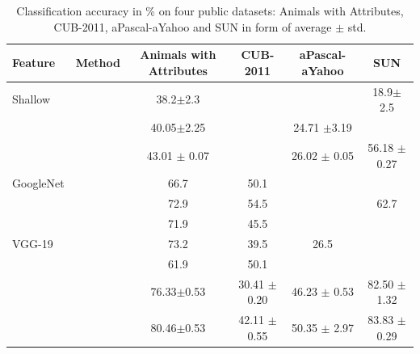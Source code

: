 \documentclass[letterpaper]{article}
\begin{document}

\begin{table}[ht]
\begin{minipage}{\textwidth}
\centering
\caption{Classification accuracy in \% on four public datasets: Animals with Attributes, CUB-2011, aPascal-aYahoo and SUN
in form of average $\pm$ std.
} \label{tab:results}
\begin{tabular}{|l|l|c|c|c|c|}
\hline
Feature & Method & Animals with Attributes & CUB-2011 & aPascal-aYahoo & SUN \\
\hline
{Shallow}
&  \cite{li15max}                 &  38.2$\pm$2.3   &                 &                         & 18.9$\pm$2.5 \\
& \cite{semi15}                    &  40.05$\pm$2.25 &                 &   24.71 $\pm$3.19       &     \\
& \cite{jayaraman14}  &43.01 $\pm$ 0.07 &                 & 26.02 $\pm$ 0.05        & 56.18 $\pm$ 0.27 \\
\hline
{GoogleNet}
& \cite{Akata2015}              & 66.7            & 50.1            &                         & \\
& \cite{Synthesized}       & 72.9            & 54.5            &                         & 62.7 \\
& \cite{Xian2016}                & 71.9            & 45.5            &                         & \\
\hline
{VGG-19}
&  \cite{Kodirov2015}
                                            & 73.2            &  39.5           & 26.5                    &  \\
& \cite{Akata2015}              & 61.9            &  50.1           &                         & \\
&  \cite{sse}            &  76.33$\pm$0.53 & 30.41 $\pm$0.20 &   46.23 $\pm$ 0.53      & 82.50 $\pm$ 1.32    \\
& \cite{agnostic}       &  80.46$\pm$0.53 & 42.11 $\pm$0.55 &   {50.35 $\pm$ 2.97}      & 83.83 $\pm$ 0.29    \\


\end{tabular}
\end{minipage}
\end{table}
\end{document}
